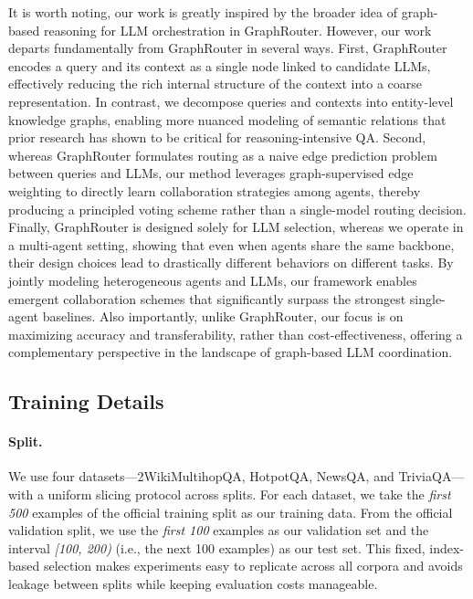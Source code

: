 \documentclass[11pt]{article}
\begin{document}
It is worth noting, our work is greatly inspired by the broader idea of graph-based reasoning for LLM orchestration in GraphRouter. However, our work departs fundamentally from GraphRouter in several ways. First, GraphRouter encodes a query and its context as a single node linked to candidate LLMs, effectively reducing the rich internal structure of the context into a coarse representation. In contrast, we decompose queries and contexts into entity-level knowledge graphs, enabling more nuanced modeling of semantic relations that prior research has shown to be critical for reasoning-intensive QA. Second, whereas GraphRouter formulates routing as a naive edge prediction problem between queries and LLMs, our method leverages graph-supervised edge weighting to directly learn collaboration strategies among agents, thereby producing a principled voting scheme rather than a single-model routing decision. Finally, GraphRouter is designed solely for LLM selection, whereas we operate in a multi-agent setting, showing that even when agents share the same backbone, their design choices lead to drastically different behaviors on different tasks. By jointly modeling heterogeneous agents and LLMs, our framework enables emergent collaboration schemes that significantly surpass the strongest single-agent baselines. Also importantly, unlike GraphRouter, our focus is on maximizing accuracy and transferability, rather than cost-effectiveness, offering a complementary perspective in the landscape of graph-based LLM coordination.

\subsection{Training Details}
\label{appendix:Training}
\paragraph{Split.}
We use four datasets—2WikiMultihopQA, HotpotQA, NewsQA, and TriviaQA—with a uniform slicing protocol across splits. For each dataset, we take the \emph{first 500} examples of the official training split as our training data. From the official validation split, we use the \emph{first 100} examples as our validation set and the interval \emph{[100, 200)} (i.e., the next 100 examples) as our test set. This fixed, index-based selection makes experiments easy to replicate across all corpora and avoids leakage between splits while keeping evaluation costs manageable.
\end{document}
